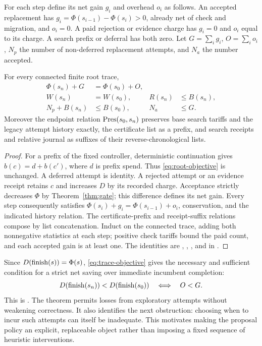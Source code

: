For each step define its net gain $g_i$ and overhead $o_i$ as follows. An accepted replacement has $g_i=\Phi(s_{i-1})-\Phi(s_i)>0$, already net of check and migration, and $o_i=0$. A paid rejection or evidence charge has $g_i=0$ and $o_i$ equal to its charge. A search prefix or deferral has both zero. Let $G=\sum_i g_i$, $O=\sum_i o_i$, $N_p$ the number of non-deferred replacement attempts, and $N_a$ the number accepted.

\begin{theorem}\label{thm:root-trace}
For every connected finite root trace,
\begin{align}
 \Phi(s_n)+G&=\Phi(s_0)+O,\label{eq:trace-objective}\\
 W(s_n)&=W(s_0),& R(s_n)&\le B(s_n),\label{eq:trace-funds}\\
 N_p+B(s_n)&\le B(s_0),& N_a&\le G.
\end{align}
Moreover the endpoint relation $\operatorname{Pres}(s_0,s_n)$ preserves base search tariffs and the legacy attempt history exactly, the certificate list as a prefix, and search receipts and relative journal as suffixes of their reverse-chronological lists.
\end{theorem}
\begin{proof}
For a prefix of the fixed controller, deterministic continuation gives $b(c)=d+b(c')$, where $d$ is prefix spend. Thus \eqref{eq:root-objective} is unchanged. A deferred attempt is identity. A rejected attempt or an evidence receipt retains $c$ and increases $D$ by its recorded charge. Acceptance strictly decreases $\Phi$ by Theorem~\ref{thm:gate}; this difference defines its net gain. Every step consequently satisfies $\Phi(s_i)+g_i=\Phi(s_{i-1})+o_i$, conservation, and the indicated history relation. The certificate-prefix and receipt-suffix relations compose by list concatenation. Induct on the connected trace, adding both nonnegative statistics at each step; positive check tariffs bound the paid count, and each accepted gain is at least one. The identities are , , , and  in .
\end{proof}
Since $D(\operatorname{finish}(s))=\Phi(s)$, \eqref{eq:trace-objective} gives the necessary and sufficient condition for a strict net saving over immediate incumbent completion:
\begin{equation}\label{eq:net-gain}
 D(\operatorname{finish}(s_n))<D(\operatorname{finish}(s_0))\quad\Longleftrightarrow\quad O<G.
\end{equation}
This is . The theorem permits losses from exploratory attempts without weakening correctness. It also identifies the next obstruction: choosing when to incur such attempts can itself be inadequate. This motivates making the proposal policy an explicit, replaceable object rather than imposing a fixed sequence of heuristic interventions.
